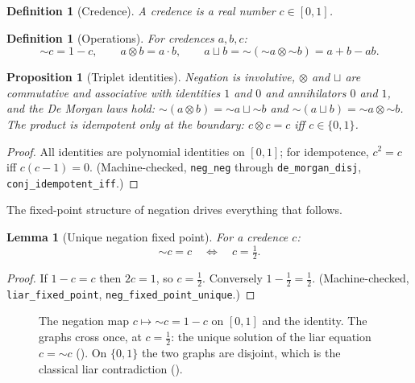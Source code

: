 \documentclass[11pt,a4paper]{article}
\newtheorem{lemma}[theorem]{Lemma}
\newtheorem{proposition}[theorem]{Proposition}
\newtheorem{definition}[theorem]{Definition}
\newcommand{\negc}{\mathord{\sim}}
\newcommand{\conjc}{\otimes}
\newcommand{\disjc}{\sqcup}
\begin{document}
\begin{definition}[Credence]
\label{def:credence}
A \emph{credence} is a real number $c \in [0,1]$.
\end{definition}

\begin{definition}[Operations]
\label{def:operations}
For credences $a, b, c$:
\[
  \negc c = 1 - c, \qquad
  a \conjc b = a \cdot b, \qquad
  a \disjc b = \negc(\negc a \conjc \negc b) = a + b - ab.
\]
\end{definition}

\begin{proposition}[Triplet identities]
\label{prop:triplet}
Negation is involutive, $\conjc$ and $\disjc$ are commutative and
associative with identities $1$ and $0$ and annihilators $0$ and $1$,
and the De Morgan laws hold:
$\negc(a \conjc b) = \negc a \disjc \negc b$ and
$\negc(a \disjc b) = \negc a \conjc \negc b$.
The product is idempotent only at the boundary: $c \conjc c = c$ iff
$c \in \{0,1\}$.
\end{proposition}
\begin{proof}
All identities are polynomial identities on $[0,1]$; for idempotence,
$c^2 = c$ iff $c(c-1) = 0$.
(Machine-checked, \texttt{neg\_neg} through \texttt{de\_morgan\_disj},
\texttt{conj\_idempotent\_iff}.)
\end{proof}

The fixed-point structure of negation drives everything that follows.

\begin{lemma}[Unique negation fixed point]
\label{lem:neg-fixed}
For a credence $c$:
\[
  \negc c = c \quad\Longleftrightarrow\quad c = \tfrac12 .
\]
\end{lemma}
\begin{proof}
If $1 - c = c$ then $2c = 1$, so $c = \tfrac12$.
Conversely $1 - \tfrac12 = \tfrac12$.
(Machine-checked, \texttt{liar\_fixed\_point},
\texttt{neg\_fixed\_point\_unique}.)
\end{proof}

\begin{figure}[ht]
\centering
{}
\caption{The negation map $c \mapsto \negc c = 1 - c$ on $[0,1]$ and
the identity.
The graphs cross once, at $c = \tfrac12$: the unique solution of the
liar equation $c = \negc c$ ().
On $\{0,1\}$ the two graphs are disjoint, which is the classical liar
contradiction ().}
\label{fig:negation}
\end{figure}
\end{document}
